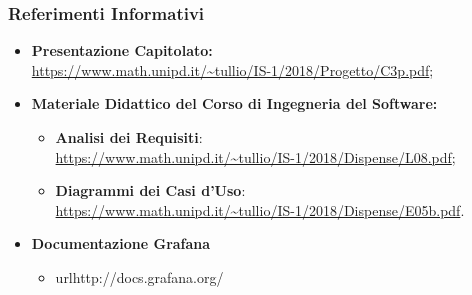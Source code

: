 \subsubsection{Referimenti Informativi}
\begin{itemize}
\item \textbf{Presentazione Capitolato:}\\ \url{https://www.math.unipd.it/~tullio/IS-1/2018/Progetto/C3p.pdf};
\item \textbf{Materiale Didattico del Corso di Ingegneria del Software:}
	\begin{itemize}
	\item \textbf{Analisi dei Requisiti}:\\ \url{https://www.math.unipd.it/~tullio/IS-1/2018/Dispense/L08.pdf};
	\item \textbf{Diagrammi dei Casi d'Uso}:\\ \url{https://www.math.unipd.it/~tullio/IS-1/2018/Dispense/E05b.pdf}.
	\end{itemize}
\item \textbf{Documentazione Grafana}
	\begin{itemize}
		\item url{http://docs.grafana.org/}
	\end{itemize}
\end{itemize}
